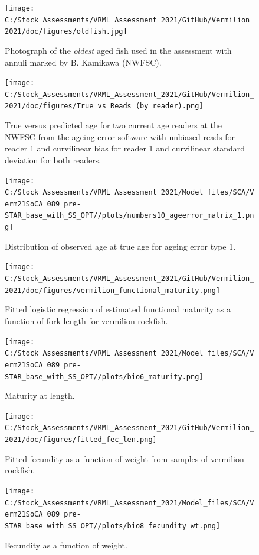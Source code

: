\documentclass[11pt,
  english,
  a4paper,
]{article}
\begin{document}
\begin{figure}
\centering
\texttt{[image: C:/Stock\_Assessments/VRML\_Assessment\_2021/GitHub/Vermilion\_2021/doc/figures/oldfish.jpg]}
\caption{Photograph of the \emph{oldest} aged fish used in the assessment with annuli marked by B. Kamikawa (NWFSC).\label{fig:oldfish}}
\end{figure}

\begin{figure}
\centering
\texttt{[image: C:/Stock\_Assessments/VRML\_Assessment\_2021/GitHub/Vermilion\_2021/doc/figures/True vs Reads (by reader).png]}
\caption{True versus predicted age for two current age readers at the NWFSC from the ageing error software with unbiased reads for reader 1 and curvilinear bias for reader 1 and curvilinear standard deviation for both readers.\label{fig:truereads}}
\end{figure}

\begin{figure}
\centering
\texttt{[image: C:/Stock\_Assessments/VRML\_Assessment\_2021/Model\_files/SCA/Verm21SoCA\_089\_pre-STAR\_base\_with\_SS\_OPT//plots/numbers10\_ageerror\_matrix\_1.png]}
\caption{Distribution of observed age at true age for ageing error type 1.\label{fig:ageerror}}
\end{figure}

\begin{figure}
\centering
\texttt{[image: C:/Stock\_Assessments/VRML\_Assessment\_2021/GitHub/Vermilion\_2021/doc/figures/vermilion\_functional\_maturity.png]}
\caption{Fitted logistic regression of estimated functional maturity as a function of fork length for vermilion rockfish.\label{fig:functional-maturity}}
\end{figure}

\begin{figure}
\centering
\texttt{[image: C:/Stock\_Assessments/VRML\_Assessment\_2021/Model\_files/SCA/Verm21SoCA\_089\_pre-STAR\_base\_with\_SS\_OPT//plots/bio6\_maturity.png]}
\caption{Maturity at length.\label{fig:maturity}}
\end{figure}

\begin{figure}
\centering
\texttt{[image: C:/Stock\_Assessments/VRML\_Assessment\_2021/GitHub/Vermilion\_2021/doc/figures/fitted\_fec\_len.png]}
\caption{Fitted fecundity as a function of weight from samples of vermilion rockfish.\label{fig:fitted-fecundity}}
\end{figure}

\begin{figure}
\centering
\texttt{[image: C:/Stock\_Assessments/VRML\_Assessment\_2021/Model\_files/SCA/Verm21SoCA\_089\_pre-STAR\_base\_with\_SS\_OPT//plots/bio8\_fecundity\_wt.png]}
\caption{Fecundity as a function of weight.\label{fig:fecundity}}
\end{figure}
\end{document}
